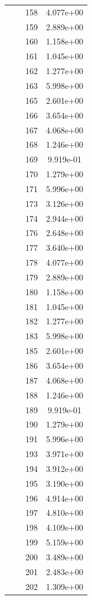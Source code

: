 \documentclass[12pt]{article}
\begin{document}
\begin{longtable}{@{}cccc@{}}
 &  & 158 & 4.077e+00 \\
 &  & 159 & 2.889e+00 \\
 &  & 160 & 1.158e+00 \\
 &  & 161 & 1.045e+00 \\
 &  & 162 & 1.277e+00 \\
 &  & 163 & 5.998e+00 \\
 &  & 165 & 2.601e+00 \\
 &  & 166 & 3.654e+00 \\
 &  & 167 & 4.068e+00 \\
 &  & 168 & 1.246e+00 \\
 &  & 169 & 9.919e-01 \\
 &  & 170 & 1.279e+00 \\
 &  & 171 & 5.996e+00 \\
 &  & 173 & 3.126e+00 \\
 &  & 174 & 2.944e+00 \\
 &  & 176 & 2.648e+00 \\
 &  & 177 & 3.640e+00 \\
 &  & 178 & 4.077e+00 \\
 &  & 179 & 2.889e+00 \\
 &  & 180 & 1.158e+00 \\
 &  & 181 & 1.045e+00 \\
 &  & 182 & 1.277e+00 \\
 &  & 183 & 5.998e+00 \\
 &  & 185 & 2.601e+00 \\
 &  & 186 & 3.654e+00 \\
 &  & 187 & 4.068e+00 \\
 &  & 188 & 1.246e+00 \\
 &  & 189 & 9.919e-01 \\
 &  & 190 & 1.279e+00 \\
 &  & 191 & 5.996e+00 \\
 &  & 193 & 3.971e+00 \\
 &  & 194 & 3.912e+00 \\
 &  & 195 & 3.190e+00 \\
 &  & 196 & 4.914e+00 \\
 &  & 197 & 4.810e+00 \\
 &  & 198 & 4.109e+00 \\
 &  & 199 & 5.159e+00 \\
 &  & 200 & 3.489e+00 \\
 &  & 201 & 2.483e+00 \\
 &  & 202 & 1.309e+00 \\

\end{longtable}
\end{document}
